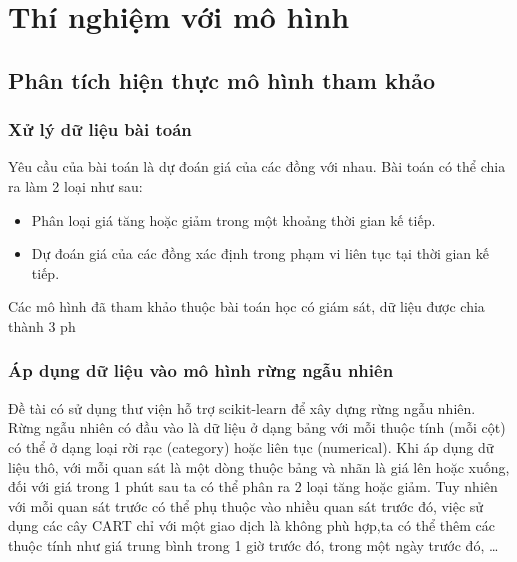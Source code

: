 \chapter{Thí nghiệm với mô hình}

\section{Phân tích hiện thực mô hình tham khảo}
\subsection{Xử lý dữ liệu bài toán}
Yêu cầu của bài toán là dự đoán giá của các đồng với nhau. Bài toán có thể chia ra làm 2 loại như sau:
\begin{itemize}
	\item Phân loại giá tăng hoặc giảm trong một khoảng thời gian kế tiếp.
	\item Dự đoán giá của các đồng xác định trong phạm vi liên tục tại thời gian kế tiếp.
\end{itemize}
Các mô hình đã tham khảo thuộc bài toán học có giám sát, dữ liệu được chia thành 3 ph

\subsection{Áp dụng dữ liệu vào mô hình rừng ngẫu nhiên}
 Đề tài có sử dụng thư viện hỗ trợ scikit-learn để xây dựng rừng ngẫu nhiên.
 Rừng ngẫu nhiên có đầu vào là dữ liệu ở dạng bảng với mỗi thuộc tính (mỗi cột) có thể ở dạng loại rời rạc (category) hoặc liên tục (numerical). Khi áp dụng dữ liệu thô, với mỗi quan sát là một dòng thuộc bảng và nhãn là giá lên hoặc xuống, đối với giá trong 1 phút sau ta có thể phân ra 2 loại tăng hoặc giảm. Tuy nhiên với mỗi quan sát trước có thể phụ thuộc vào nhiều quan sát trước đó, việc sử dụng các cây CART chỉ với một giao dịch là không phù hợp,ta có thể thêm các thuộc tính như giá trung bình trong 1 giờ trước đó, trong một ngày trước đó, \dots
 
